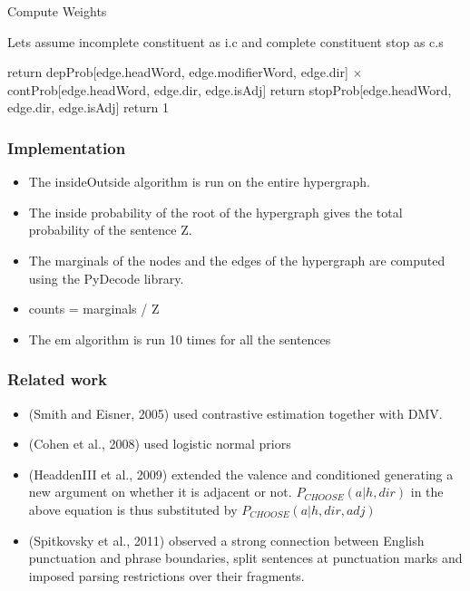 \documentclass{beamer}
\begin{document}
\begin{frame}

\begin{algorithm}[H]
\caption{Compute Weights}
\begin{algorithmic}

\State Lets assume incomplete constituent as i.c and complete constituent stop as c.s

   \State return depProb[edge.headWord, edge.modifierWord, edge.dir] $\times$ contProb[edge.headWord, edge.dir, edge.isAdj]
   \State return stopProb[edge.headWord, edge.dir, edge.isAdj]
\Else
   \State return 1
\EndIf

\end{algorithmic}
\end{algorithm}

\end{frame}

\begin{frame}


\frametitle{Implementation}
\begin{itemize}

\item The insideOutside algorithm is run on the entire hypergraph.

\item  The inside probability of the root of the hypergraph gives the total probability of the sentence Z. 

\item The marginals of the nodes and the edges of the hypergraph are computed using the PyDecode library. 

\item counts = marginals / Z

\item The em algorithm is run 10 times for all the sentences

\end{itemize}
\end{frame}

\begin{frame}
\frametitle{Related work}


\begin{itemize}
\item (Smith and Eisner, 2005) used contrastive estimation together with DMV.
\item (Cohen et al., 2008) used logistic normal priors

\item (HeaddenIII et al., 2009) extended the valence and conditioned generating a new argument on whether it is adjacent or not. $P_{CHOOSE}(a|h, dir)$ in the above equation is thus substituted by $P_{CHOOSE}(a|h, dir, adj)$

\item (Spitkovsky et al., 2011) observed a strong connection between English punctuation and phrase boundaries, split sentences at punctuation marks and imposed parsing restrictions over their fragments.

\end{itemize}

\end{frame}
\end{document}
